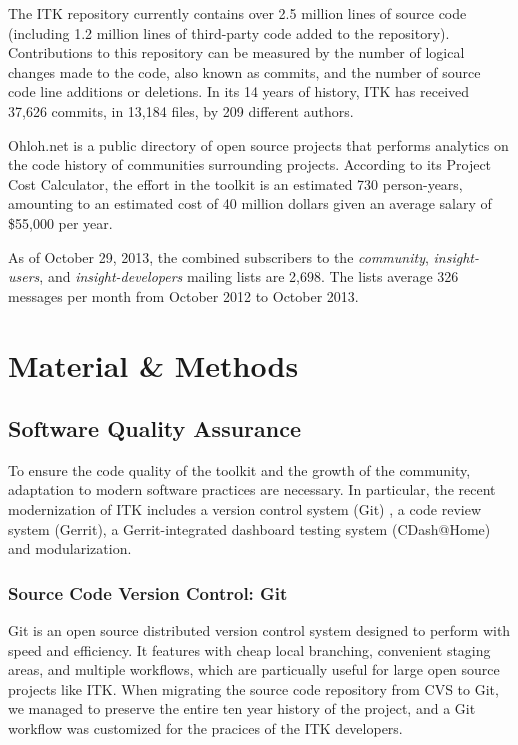 \documentclass{frontiersENG} %
\begin{document}
%
%
The ITK repository currently contains over 2.5 million lines of source code
(including 1.2 million lines of third-party code added to the repository).
Contributions to this repository can be measured by the number of logical
changes made to the code, also known as commits, and the number of source code
line additions or deletions. In its 14 years of history, ITK has received
37,626 commits, in 13,184 files, by 209 different authors.

Ohloh.net is a public directory of open source projects that performs analytics
on the code history of communities surrounding projects. According to its
Project Cost Calculator\cite{OhlohITK2013}, the effort in the toolkit is an
estimated 730 person-years, amounting to an estimated cost of 40 million
dollars given an average salary of \$55,000 per year.

As of October 29, 2013, the combined subscribers to the \textit{community},
\textit{insight-users}, and \textit{insight-developers} mailing lists are 2,698.
The lists average 326 messages per month from October 2012 to October 2013.


\section{Material \& Methods}

\subsection{Software Quality Assurance}

To ensure the code quality of the toolkit and the growth of the community,
adaptation to modern software practices are necessary. In particular, the
recent modernization of ITK includes a version control system (Git) , a code
review system (Gerrit), a Gerrit-integrated dashboard testing system
(CDash@Home) and modularization.

\subsubsection{Source Code Version Control: Git} Git is an open source
distributed version control system designed to perform with speed and
efficiency. It features with cheap local branching, convenient staging areas,
and multiple workflows, which are particually useful for large open source
projects like ITK. When migrating the source code repository from CVS to Git,
we managed to preserve the entire ten year history of the project, and  a Git
workflow was customized for the pracices of the ITK developers.
\end{document}
